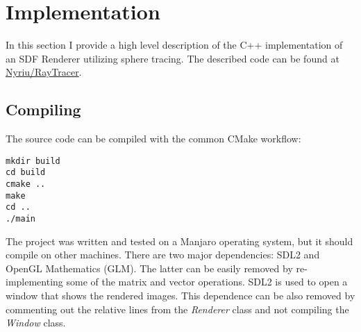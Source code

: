 
\section{Implementation}
In this section I provide a high level description of the C++ implementation of an SDF Renderer utilizing sphere tracing.
The described code can be found at \href{https://github.com/Nyriu/RayTracer}{Nyriu/RayTracer}.

\subsection{Compiling}
The source code can be compiled with the common CMake workflow:
\begin{lstlisting}
mkdir build
cd build
cmake ..
make
cd ..
./main
\end{lstlisting}
The project was written and tested on a Manjaro operating system, but it should compile on other machines.
There are two major dependencies: SDL2 and OpenGL Mathematics (GLM).
The latter can be easily removed by re-implementing some of the matrix and vector operations.
SDL2 is used to open a window that shows the rendered images.
This dependence can be also removed by commenting out the relative lines from the \emph{Renderer} class and not compiling the \emph{Window} class.


